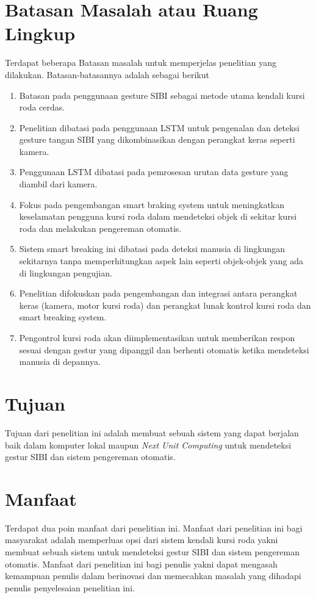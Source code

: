 \section{Batasan Masalah atau Ruang Lingkup}

Terdapat beberapa Batasan masalah untuk memperjelas penelitian yang dilakukan. Batasan-batasannya adalah sebagai berikut

\begin{enumerate}
    \item Batasan pada penggunaan gesture SIBI sebagai metode utama kendali kursi roda cerdas.
    \item Penelitian dibatasi pada penggunaan LSTM untuk pengenalan dan deteksi gesture tangan SIBI yang dikombinasikan dengan perangkat keras seperti kamera.
    \item Penggunaan LSTM dibatasi pada pemrosesan urutan data gesture yang diambil dari kamera.
    \item Fokus pada pengembangan smart braking system untuk meningkatkan keselamatan pengguna kursi roda dalam mendeteksi objek di sekitar kursi roda dan melakukan pengereman otomatis. 
    \item Sistem smart breaking ini dibatasi pada deteksi manusia di lingkungan sekitarnya tanpa memperhitungkan aspek lain seperti objek-objek yang ada di lingkungan pengujian.
    \item Penelitian difokuskan pada pengembangan dan integrasi antara perangkat keras (kamera, motor kursi roda) dan perangkat lunak kontrol kursi roda dan smart breaking system.
    \item Pengontrol kursi roda akan diimplementasikan untuk memberikan respon sesuai dengan gestur yang dipanggil dan berhenti otomatis ketika mendeteksi manusia di depannya.
\end{enumerate}

\section{Tujuan}

Tujuan dari penelitian ini adalah membuat sebuah sistem yang dapat berjalan baik dalam komputer lokal maupun \emph{Next Unit Computing} untuk mendeteksi gestur SIBI dan sistem pengereman otomatis.

\section{Manfaat}

Terdapat dua poin manfaat dari penelitian ini. Manfaat dari penelitian ini bagi masyarakat adalah memperluas opsi dari sistem kendali kursi roda yakni membuat sebuah sistem untuk mendeteksi gestur SIBI dan sistem pengereman otomatis. Manfaat dari penelitian ini bagi penulis yakni dapat mengasah kemampuan penulis dalam berinovasi dan memecahkan masalah yang dihadapi penulis penyelesaian penelitian ini.

